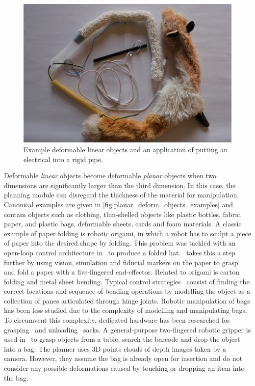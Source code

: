 \begin{figure}[htbp!]
    \centering
    \includegraphics[keepaspectratio,width=\textwidth]{figures/fig_dlos.JPG}
    \caption{Example deformable linear objects and an application of putting an electrical into a rigid pipe.}
    \label{fig:dlo_examples}
\end{figure}

Deformable \textit{linear} objects become deformable \textit{planar} objects when two dimensions are significantly larger than the third dimension. 
In this case, the planning module can disregard the thickness of the material for manipulation. Canonical examples are given in \cref{fig:planar_deform_objects_examples} and contain objects such as clothing, thin-shelled objects like plastic bottles, fabric, paper, and plastic bags, deformable sheets, cards and foam materials. A classic example of paper folding is robotic origami, in which a robot has to sculpt a piece of paper into the desired shape by folding. This problem was tackled with an open-loop control architecture in~\autocite{Balkcom2008} to produce a folded hat.~\Textcite{Elbrechter2012} takes this a step further by using vision, simulation and fiducial markers on the paper to grasp and fold a paper with a five-fingered end-effector. Related to origami is carton folding and metal sheet bending. Typical control strategies~\autocite{Liang1999,Liu2003,Aomura2002} consist of finding the correct locations and sequence of bending operations by modelling the object as a collection of panes articulated through hinge joints. Robotic manipulation of bags has been less studied due to the complexity of modelling and manipulating bags. To circumvent this complexity, dedicated hardware has been researched for grasping~\autocite{Kazerooni2005} and unloading~\autocite{Kirchheim2008} sacks. A general-purpose two-fingered robotic gripper is used in~\autocite{Klingbeil2011} to grasp objects from a table, search the barcode and drop the object into a bag. The planner uses 3D points clouds of depth images taken by a camera. However, they assume the bag is already open for insertion and do not consider any possible deformations caused by touching or dropping an item into the bag.

